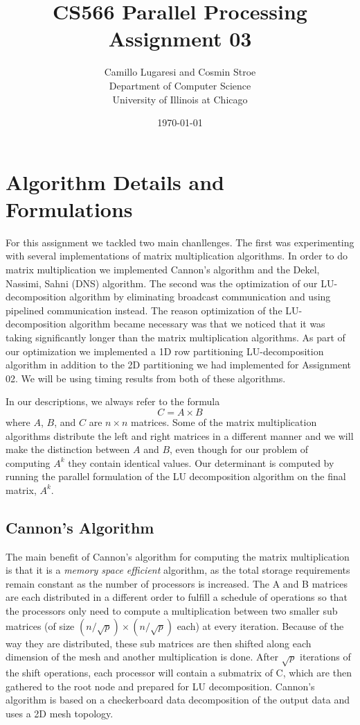 \documentclass{article}
\title{CS566 Parallel Processing \\ Assignment 03}
\author{Camillo Lugaresi and Cosmin Stroe \vspace{20pt} \\ Department of Computer Science \\
University of Illinois at Chicago}
\date{\today}
\begin{document}
\maketitle
\newpage

\section{Algorithm Details and Formulations}

For this assignment we tackled two main chanllenges.  The first was
experimenting with several implementations of matrix multiplication algorithms. 
In order to do matrix multiplication we implemented Cannon's algorithm and the
Dekel, Nassimi, Sahni (DNS) algorithm.  The second was the optimization of our
LU-decomposition algorithm by eliminating broadcast communication and using
pipelined communication instead.  The reason optimization of the
LU-decomposition algorithm became necessary was that we noticed that it was
taking significantly longer than the matrix multiplication algorithms.  As part
of our optimization we implemented a 1D row partitioning LU-decomposition
algorithm in addition to the 2D partitioning we had implemented for
Assignment 02.  We will be using timing results from both of these algorithms.

In our descriptions, we always refer to the formula $$C = A \times B$$ where
$A$, $B$, and $C$ are $n \times n$ matrices.  Some of the matrix multiplication
algorithms distribute the left and right matrices in a different manner and we
will make the distinction between $A$ and $B$, even though for our problem of
computing $A^k$ they contain identical values.  Our determinant is computed by
running the parallel formulation of the LU decomposition algorithm on the final
matrix, $A^k$.



\subsection{Cannon's Algorithm}

The main benefit of Cannon's algorithm for computing the matrix multiplication
is that it is a \textit{memory space efficient} algorithm, as the total storage
requirements remain constant as the number of processors is
increased.  The A and B matrices are each distributed in a different order to
fulfill a schedule of operations so that the processors only need to compute a multiplication
between two smaller sub matrices (of size $(n/\sqrt{p})\times(n/\sqrt{p})$ each) at every iteration.  
Because of the way they are distributed, these sub matrices are then shifted
along each dimension of the mesh and another multiplication is done. After
$\sqrt{p}$ iterations of the shift operations, each processor will contain a
submatrix of C, which are then gathered to the root node and prepared for LU
decomposition.  Cannon's algorithm is based on a checkerboard data
decomposition of the output data and uses a 2D mesh topology.
\end{document}
